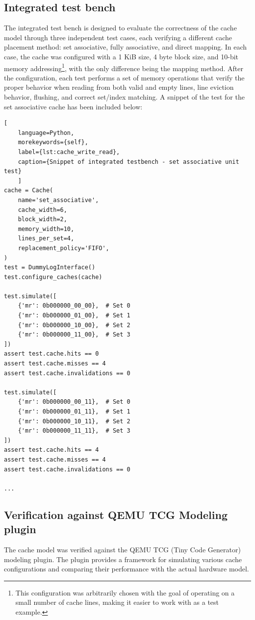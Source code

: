 \subsection{Integrated test bench}
The integrated test bench is designed to evaluate the correctness of the cache model through three independent test cases, each verifying a different cache placement method:
set associative, fully associative, and direct mapping. In each case, the cache was configured with a 1 KiB size, 4 byte block size, and 10-bit memory addressing\footnote{This
configuration was arbitrarily chosen with the goal of operating on a small number of cache lines, making it easier to work with as a test example.}, with the only difference
being the mapping method. After the configuration, each test performs a set of memory operations that verify the proper behavior when reading from both valid and empty lines, line
eviction behavior, flushing, and correct set/index matching. A snippet of the test for the set associative cache has been included below:

\begin{center}
\centering
\begin{minipage}{\linewidth}
\begin{lstlisting}[
    language=Python,
	morekeywords={self},
    label={lst:cache_write_read},
    caption={Snippet of integrated testbench - set associative unit test}
    ]
cache = Cache(
    name='set_associative',
    cache_width=6,
    block_width=2,
    memory_width=10,
    lines_per_set=4,
    replacement_policy='FIFO',
)
test = DummyLogInterface()
test.configure_caches(cache)

test.simulate([
    {'mr': 0b000000_00_00},  # Set 0
    {'mr': 0b000000_01_00},  # Set 1
    {'mr': 0b000000_10_00},  # Set 2
    {'mr': 0b000000_11_00},  # Set 3
])
assert test.cache.hits == 0
assert test.cache.misses == 4
assert test.cache.invalidations == 0

test.simulate([
    {'mr': 0b000000_00_11},  # Set 0
    {'mr': 0b000000_01_11},  # Set 1
    {'mr': 0b000000_10_11},  # Set 2
    {'mr': 0b000000_11_11},  # Set 3
])
assert test.cache.hits == 4
assert test.cache.misses == 4
assert test.cache.invalidations == 0

...
\end{lstlisting}
\end{minipage}
\end{center}

\subsection{Verification against QEMU TCG Modeling plugin}
The cache model was verified against the QEMU TCG (Tiny Code Generator) modeling plugin. The plugin provides a framework for simulating various cache configurations and comparing
their performance with the actual hardware model.

